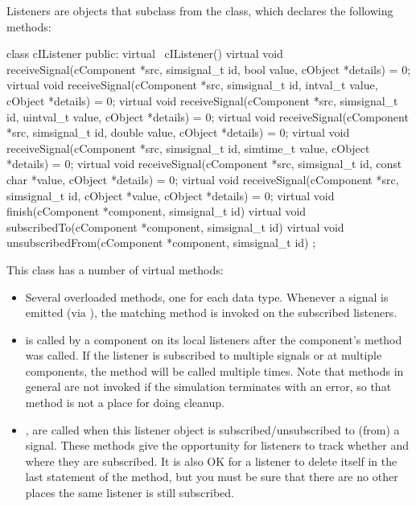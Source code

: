 \begin{ned}
Listeners are objects that subclass from the  class, which
declares the following methods:

\begin{cpp}
class cIListener
{
  public:
    virtual ~cIListener() {}
    virtual void receiveSignal(cComponent *src, simsignal_t id,
                               bool value, cObject *details) = 0;
    virtual void receiveSignal(cComponent *src, simsignal_t id,
                               intval_t value, cObject *details) = 0;
    virtual void receiveSignal(cComponent *src, simsignal_t id,
                               uintval_t value, cObject *details) = 0;
    virtual void receiveSignal(cComponent *src, simsignal_t id,
                               double value, cObject *details) = 0;
    virtual void receiveSignal(cComponent *src, simsignal_t id,
                               simtime_t value, cObject *details) = 0;
    virtual void receiveSignal(cComponent *src, simsignal_t id,
                               const char *value, cObject *details) = 0;
    virtual void receiveSignal(cComponent *src, simsignal_t id,
                               cObject *value, cObject *details) = 0;
    virtual void finish(cComponent *component, simsignal_t id) {}
    virtual void subscribedTo(cComponent *component, simsignal_t id) {}
    virtual void unsubscribedFrom(cComponent *component, simsignal_t id) {}
};
\end{cpp}

This class has a number of virtual methods:

\begin{itemize}
  \item Several overloaded  methods, one for each
    data type. Whenever a signal is emitted (via ), the matching
     method is invoked on the subscribed listeners.
  \item {} is called by a component on its local listeners
    after the component's  method was called. If the listener
    is subscribed to multiple signals or at multiple components, the method
    will be called multiple times. Note that  methods in general
    are not invoked if the simulation terminates with an error, so that method
    is not a place for doing cleanup.
  \item {},  are called
    when this listener object is subscribed/unsubscribed to (from) a signal.
    These methods give the opportunity for listeners to track whether
    and where they are subscribed. It is also OK for a listener to delete
    itself in the last statement of the  method,
    but you must be sure that there are no other places the same listener
    is still subscribed.
\end{itemize}


\end{ned}

